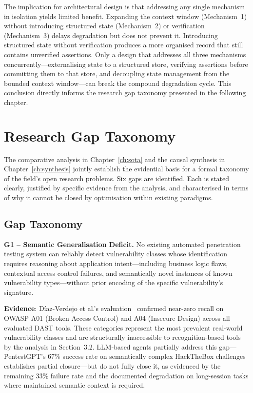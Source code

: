 \documentclass[12pt,a4paper,oneside,openany]{book}
\begin{document}
The implication for architectural design is that addressing any single mechanism in isolation yields limited benefit. Expanding the context window (Mechanism~1) without introducing structured state (Mechanism~2) or verification (Mechanism~3) delays degradation but does not prevent it. Introducing structured state without verification produces a more organised record that still contains unverified assertions. Only a design that addresses all three mechanisms concurrently---externalising state to a structured store, verifying assertions before committing them to that store, and decoupling state management from the bounded context window---can break the compound degradation cycle. This conclusion directly informs the research gap taxonomy presented in the following chapter.

\chapter{Research Gap Taxonomy}
\label{ch:gaps}

The comparative analysis in Chapter~\ref{ch:sota} and the causal synthesis in Chapter~\ref{ch:synthesis} jointly establish the evidential basis for a formal taxonomy of the field's open research problems. Six gaps are identified. Each is stated clearly, justified by specific evidence from the analysis, and characterised in terms of why it cannot be closed by optimisation within existing paradigms.

\section{Gap Taxonomy}


\noindent\textbf{G1 -- Semantic Generalisation Deficit.} No existing automated penetration testing system can reliably detect vulnerability classes whose identification requires reasoning about application intent---including business logic flaws, contextual access control failures, and semantically novel instances of known vulnerability types---without prior encoding of the specific vulnerability's signature.


\textbf{Evidence}: D\'{i}az-Verdejo et al.'s evaluation~\citep{diaz2022evaluation} confirmed near-zero recall on OWASP A01 (Broken Access Control) and A04 (Insecure Design) across all evaluated DAST tools. These categories represent the most prevalent real-world vulnerability classes and are structurally inaccessible to recognition-based tools by the analysis in Section~3.2. LLM-based agents partially address this gap---PentestGPT's 67\% success rate on semantically complex HackTheBox challenges establishes partial closure---but do not fully close it, as evidenced by the remaining 33\% failure rate and the documented degradation on long-session tasks where maintained semantic context is required.
\end{document}
